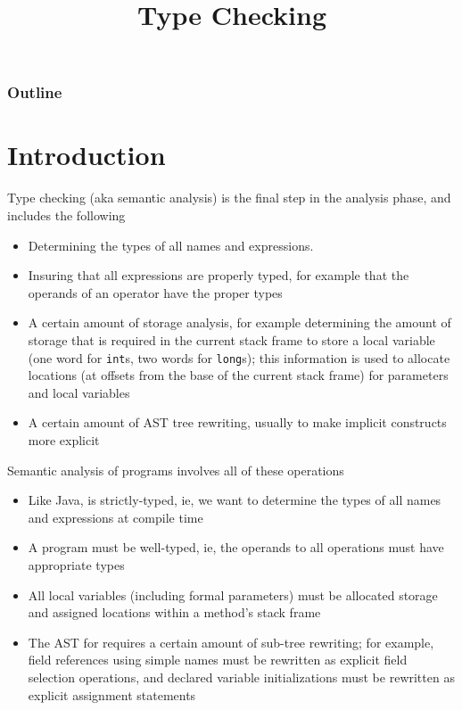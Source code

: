 \documentclass[8pt,a4paper,compress]{beamer}
\title{Type Checking}
\date{}
\begin{document}
\begin{frame}
\vfill
\titlepage
\end{frame}

\begin{frame}
\frametitle{Outline}
\tableofcontents
\end{frame}

\section{Introduction}
\begin{frame}[fragile]
\pause

Type checking (aka semantic analysis) is the final step in the analysis phase, and includes the following

\begin{itemize}
\item Determining the types of all names and expressions.
\item Insuring that all expressions are properly typed, for example that the operands of an operator have the proper types
\item A certain amount of storage analysis, for example determining the amount of storage that is required in the current stack frame to store a local variable (one word for \lstinline{int}s, two words for \lstinline{long}s); this information is used to allocate locations (at offsets from the base of the current stack frame) for parameters and local variables
\item A certain amount of AST tree rewriting, usually to make implicit constructs more explicit
\end{itemize}
\end{frame}

\begin{frame}[fragile]
\pause

Semantic analysis of \jmm programs involves all of these operations
\begin{itemize}
\item Like Java, \jmm is strictly-typed, ie, we want to determine the types of all names and expressions at compile time
\item A \jmm program must be well-typed, ie, the operands to all operations must have appropriate types
\item All \jmm local variables (including formal parameters)  must be allocated storage and assigned locations within a method's stack frame
\item The AST for \jmm requires a certain amount of sub-tree rewriting; for example, field references using simple names must be rewritten as explicit field selection operations, and declared variable initializations must be rewritten as explicit assignment statements
\end{itemize}
\end{frame}
\end{document}
